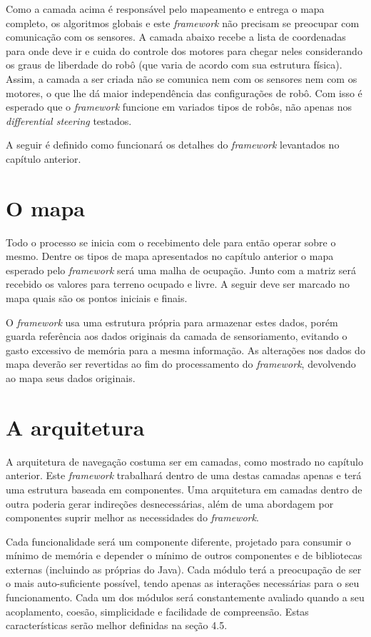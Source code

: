 Como a camada acima é responsável pelo mapeamento e entrega o mapa completo, os algoritmos globais e este \textit{framework} não precisam se preocupar com comunicação com os sensores. A camada abaixo recebe a lista de coordenadas para onde deve ir e cuida do controle dos motores para chegar neles considerando os graus de liberdade do robô (que varia de acordo com sua estrutura física). Assim, a camada a ser criada não se comunica nem com os sensores nem com os motores, o que lhe dá maior independência das configurações de robô. Com isso é esperado que o \textit{framework} funcione em variados tipos de robôs, não apenas nos \textit{differential steering} testados.

A seguir é definido como funcionará os detalhes do \textit{framework} levantados no capítulo anterior.

\section{O mapa}

Todo o processo se inicia com o recebimento dele para então operar sobre o mesmo. Dentre os tipos de mapa apresentados no capítulo anterior o mapa esperado pelo \textit{framework} será uma malha de ocupação. Junto com a matriz será recebido os valores para terreno ocupado e livre. A seguir deve ser marcado no mapa quais são os pontos iniciais e finais.

O \textit{framework} usa uma estrutura própria para armazenar estes dados, porém guarda referência aos dados originais da camada de sensoriamento, evitando o gasto excessivo de memória para a mesma informação. As alterações nos dados do mapa deverão ser revertidas ao fim do processamento do \textit{framework}, devolvendo ao mapa seus dados originais.

\section{A arquitetura}

A arquitetura de navegação costuma ser em camadas, como mostrado no capítulo anterior. Este \textit{framework} trabalhará dentro de uma destas camadas apenas e terá uma estrutura baseada em componentes. Uma arquitetura em camadas dentro de outra poderia gerar indireções desnecessárias, além de uma abordagem por componentes suprir melhor as necessidades do \textit{framework}.

Cada funcionalidade será um componente diferente, projetado para consumir o mínimo de memória e depender o mínimo de outros componentes e de bibliotecas externas (incluindo as próprias do Java). Cada módulo terá a preocupação de ser o mais auto-suficiente possível, tendo apenas as interações necessárias para o seu funcionamento. Cada um dos módulos será constantemente avaliado quando a seu acoplamento, coesão,  simplicidade e facilidade de compreensão. Estas características serão melhor definidas na seção 4.5.

